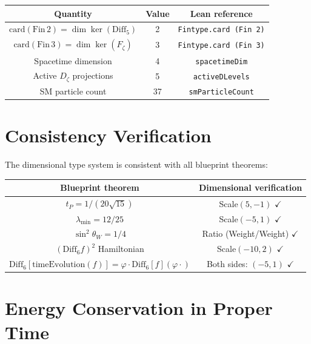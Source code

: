 \begin{center}
\begin{tabular}{|c|c|c|}
\hline
Quantity & Value & Lean reference \\
\hline
$\mathrm{card}(\mathrm{Fin}\,2) = \dim\ker(\mathrm{Diff}_5)$ & 2 & \texttt{Fintype.card (Fin 2)} \\
$\mathrm{card}(\mathrm{Fin}\,3) = \dim\ker(F_\zeta)$ & 3 & \texttt{Fintype.card (Fin 3)} \\
Spacetime dimension & 4 & \texttt{spacetimeDim} \\
Active $D_\zeta$ projections & 5 & \texttt{activeDLevels} \\
SM particle count & 37 & \texttt{smParticleCount} \\
\hline
\end{tabular}
\end{center}

\section{Consistency Verification}
\label{sec:dim_consistency}

\begin{theorem}
\label{thm:dim_blueprint_consistency}
The dimensional type system is consistent with all blueprint theorems:
\begin{center}
\begin{tabular}{|c|c|}
\hline
Blueprint theorem & Dimensional verification \\
\hline
$t_P = 1/(20\sqrt{15})$ & Scale$(5,-1)$ $\checkmark$ \\
$\lambda_{\min} = 12/25$ & Scale$(-5,1)$ $\checkmark$ \\
$\sin^2\theta_W = 1/4$ & Ratio (Weight/Weight) $\checkmark$ \\
$(\mathrm{Diff}_6 f)^2$ Hamiltonian & Scale$(-10,2)$ $\checkmark$ \\
$\mathrm{Diff}_6[\mathrm{timeEvolution}(f)] = \varphi \cdot \mathrm{Diff}_6[f](\varphi \cdot)$ & Both sides: $(-5,1)$ $\checkmark$ \\
\hline
\end{tabular}
\end{center}
\end{theorem}

\section{Energy Conservation in Proper Time}
\label{sec:dim_energy_conservation}

